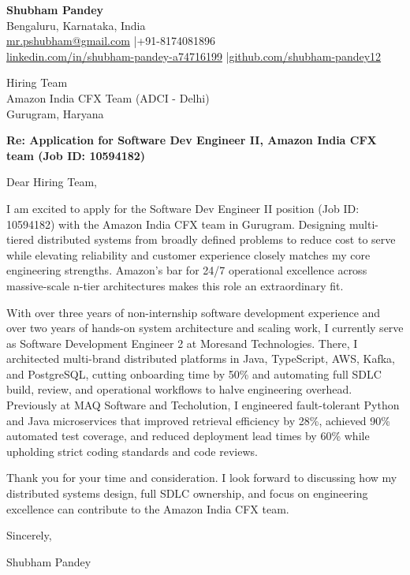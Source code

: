 \documentclass[a4paper,11pt]{article}
\begin{document}
\textbf{Shubham Pandey} \\
Bengaluru, Karnataka, India \\
\href{mailto:mr.pshubham@gmail.com}{mr.pshubham@gmail.com} \quad|\quad +91-8174081896 \\
\href{https://www.linkedin.com/in/shubham-pandey-a74716199/}{linkedin.com/in/shubham-pandey-a74716199} \quad|\quad \href{https://github.com/shubham-pandey12}{github.com/shubham-pandey12}

\vspace{1em}

Hiring Team \\
Amazon India CFX Team (ADCI - Delhi) \\
Gurugram, Haryana

\vspace{1em}

\textbf{Re: Application for Software Dev Engineer II, Amazon India CFX team (Job ID: 10594182)}

Dear Hiring Team,

I am excited to apply for the Software Dev Engineer II position (Job ID: 10594182) with the Amazon India CFX team in Gurugram. Designing multi-tiered distributed systems from broadly defined problems to reduce cost to serve while elevating reliability and customer experience closely matches my core engineering strengths. Amazon's bar for 24/7 operational excellence across massive-scale n-tier architectures makes this role an extraordinary fit.

With over three years of non-internship software development experience and over two years of hands-on system architecture and scaling work, I currently serve as Software Development Engineer 2 at Moresand Technologies. There, I architected multi-brand distributed platforms in Java, TypeScript, AWS, Kafka, and PostgreSQL, cutting onboarding time by 50\% and automating full SDLC build, review, and operational workflows to halve engineering overhead. Previously at MAQ Software and Techolution, I engineered fault-tolerant Python and Java microservices that improved retrieval efficiency by 28\%, achieved 90\% automated test coverage, and reduced deployment lead times by 60\% while upholding strict coding standards and code reviews.

Thank you for your time and consideration. I look forward to discussing how my distributed systems design, full SDLC ownership, and focus on engineering excellence can contribute to the Amazon India CFX team.

\vspace{1em}

Sincerely,

Shubham Pandey
\end{document}
